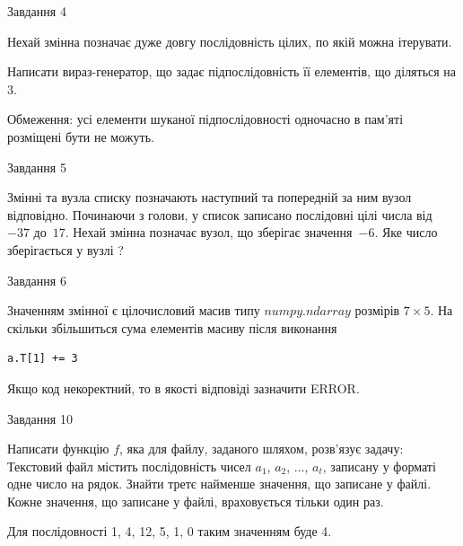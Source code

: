 \documentclass[12pt, ukrainian]{article}
\begin{document}
{               
{\begin{center}Завдання {4}\end{center}}
\vspace{-6mm}
Нехай змінна  позначає дуже довгу послідовність цілих, по якій можна ітерувати.

Написати вираз-генератор, що задає підпослідовність її елементів, що діляться на 3.

Обмеження: усі елементи шуканої підпослідовності одночасно в пам'яті розміщені бути не можуть.\par

\vspace{10mm}
               
{\begin{center}Завдання {5}\end{center}}
\vspace{-6mm}
Змінні  та  вузла списку позначають наступний та попередній за ним вузол відповідно. Починаючи з голови, у список записано послідовні цілі числа від~$-37$ до~$17$. Нехай змінна  позначає вузол, що зберігає значення~$-6$.
Яке число зберігається у вузлі  ?\par

               
{\begin{center}Завдання {6}\end{center}}
\vspace{-6mm}
Значенням змінної  є цілочисловий масив типу $numpy.ndarray$ розмірів $7{\times}5$. На скільки збільшиться сума елементів масиву  після виконання
\begin{verbatim}
a.T[1] += 3
\end{verbatim}


Якщо код некоректний, то в якості відповіді зазначити ERROR.\par

               
{\begin{center}Завдання {10}\end{center}}
\vspace{-6mm}

Написати функцію $f$, яка для файлу, заданого шляхом, розв’язує задачу:\\ Текстовий файл містить послідовність чисел $a_1$, $a_2$, $\ldots$, $a_t$, записану у форматі одне число на рядок. Знайти третє найменше значення, що записане у файлі. Кожне значення, що записане у файлі, враховується тільки один раз. \par
Для послідовності 1, 4, 12, 5, 1, 0 таким значенням буде 4.

}
\end{document}
